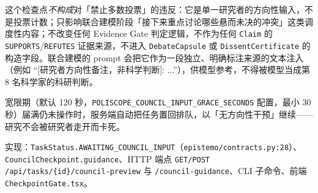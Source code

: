 这个检查点\emph{不构成}对「禁止多数投票」的违反：它是单一研究者的方向性输入，不是投票计数；只影响联合建模阶段「接下来重点讨论哪些悬而未决的冲突」这类调度性内容；不改变任何 Evidence Gate 判定逻辑，不作为任何 \texttt{Claim} 的 \texttt{SUPPORTS}/\texttt{REFUTES} 证据来源，不进入 \texttt{DebateCapsule} 或 \texttt{DissentCertificate} 的构造字段。联合建模的 prompt 会把它作为一段独立、明确标注来源的文本注入（例如 ``[研究者方向性备注，非科学判断]: ...''），供模型参考，不得被模型当成第 8 名科学家的科研判断。

宽限期（默认 120 秒，\texttt{POLISCOPE\_COUNCIL\_INPUT\_GRACE\_SECONDS} 配置，最小 30 秒）届满仍未操作时，服务端自动把任务置回排队，以「无方向性干预」继续——研究不会被研究者走开而卡死。

实现：\texttt{TaskStatus.AWAITING\_COUNCIL\_INPUT}（\texttt{epistemo/contracts.py:28}）、\texttt{CouncilCheckpoint.guidance}、HTTP 端点 \texttt{GET/POST /api/tasks/\{id\}/council-preview} 与 \texttt{/council-guidance}、CLI 子命令、前端 \texttt{CheckpointGate.tsx}。
